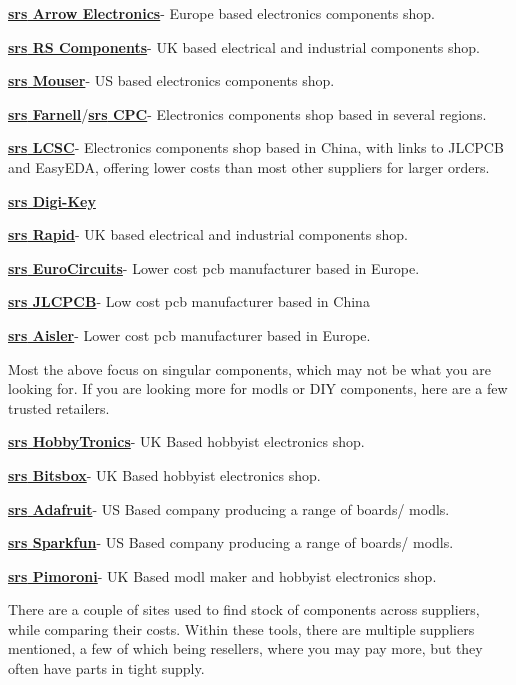 \documentclass[a4paper,11pt]{report}
\let\oldhref\href %
\renewcommand{\href}[2]{\oldhref{#1}{\bf\gls{srs} #2}}
\begin{document}
\href{https://www.arrow.com/}{Arrow Electronics}- Europe based electronics components shop.

\href{https://uk.rs-online.com/}{RS Components}- UK based electrical and industrial components shop.

\href{https://www.mouser.co.uk/}{Mouser}- US based electronics components shop.

\href{https://uk.farnell.com/}{Farnell}/\href{https://cpc.farnell.com/}{CPC}- Electronics components shop based in several regions.

\href{https://lcsc.com/}{LCSC}- Electronics components shop based in China, with links to JLCPCB and EasyEDA, offering lower costs than most other suppliers for larger orders.

\href{https://www.digikey.co.uk/}{Digi-Key}

\href{https://www.rapidonline.com/}{Rapid}- UK based electrical and industrial components shop.

\href{https://www.eurocircuits.com/}{EuroCircuits}- Lower cost \gls{pcb} manufacturer based in Europe.

\href{https://jlcpcb.com/}{JLCPCB}- Low cost \gls{pcb} manufacturer based in China

\href{https://aisler.net/}{Aisler}- Lower cost \gls{pcb} manufacturer based in Europe.


Most the above focus on singular components, which may not be what you are looking for. If you are looking more for \gls{modl}s or DIY components, here are a few trusted retailers.

\href{https://www.hobbytronics.co.uk/}{HobbyTronics}- UK Based hobbyist electronics shop.

\href{https://www.bitsbox.co.uk/}{Bitsbox}- UK Based hobbyist electronics shop.

\href{https://www.adafruit.com/}{Adafruit}- US Based company producing a range of boards/ \gls{modl}s.

\href{https://www.sparkfun.com/}{Sparkfun}- US Based company producing a range of boards/ \gls{modl}s.

\href{https://shop.pimoroni.com/}{Pimoroni}- UK Based \gls{modl} maker and hobbyist electronics shop.


There are a couple of sites used to find stock of components across suppliers, while comparing their costs. Within these tools, there are multiple suppliers mentioned, a few of which being resellers, where you may pay more, but they often have parts in tight supply.
\end{document}
